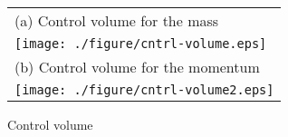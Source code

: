 \begin{figure}[t]
\begin{center}
  \begin{tabular}{l}
    (a) Control volume for the mass\\
  \texttt{[image: ./figure/cntrl-volume.eps]}\\
    (b) Control volume for the momentum\\
  \texttt{[image: ./figure/cntrl-volume2.eps]}\\
  \end{tabular}
\end{center}
  \caption{Control volume}
  \label{fig:cntrl-volume}
\end{figure}
